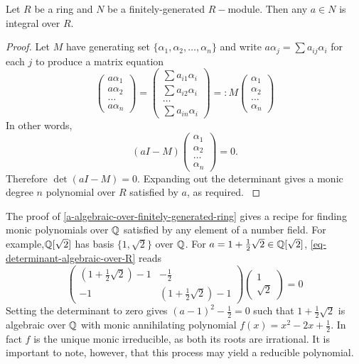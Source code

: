 \begin{lemma}\label{a-algebraic-over-finitely-generated-ring}
Let $R$ be a ring and $N$ be a finitely-generated $R-$module. Then any $a\in N$ is integral over $R$.
\end{lemma}
\begin{proof}
Let $M$ have generating set $\{\alpha_1,\alpha_2,\dots,\alpha_n\}$ and write $a\alpha_j=\sum a_{ij}\alpha_i$ for each $j$ to produce a matrix equation
$$\begin{pmatrix}
    a\alpha_1\\
    a\alpha_2\\
    \dots\\
    a\alpha_n
\end{pmatrix}=\begin{pmatrix} \sum a_{i1}\alpha_i\\\sum a_{i2}\alpha_i\\\dots\\\sum a_{in}\alpha_i
\end{pmatrix}=: M\begin{pmatrix}\alpha_1\\\alpha_2\\\dots\\\alpha_n\end{pmatrix}$$
In other words,
\begin{equation}\label{eq-determinant-algebraic-over-R}(a I-M)\begin{pmatrix}\alpha_1\\\alpha_2\\\dots\\\alpha_n\end{pmatrix}=0.\end{equation}
Therefore $\det(aI-M)=0$. Expanding out the determinant gives a monic degree $n$ polynomial over $R$ satisfied by $a$, as required. \cite{NumberFields}
\end{proof}


\begin{example}\label{recipe-for-finding-polys-over-q}
The proof of \cref{a-algebraic-over-finitely-generated-ring} gives a recipe for finding monic polynomials over $\mathbb{Q}$ satisfied by any element of a number field. For example,$\mathbb{Q}[\sqrt{2}]$ has basis $\{1,\sqrt{2}\}$ over $\mathbb{Q}$. For $a=1+\frac{1}{2}\sqrt{2}\in \mathbb{Q}[\sqrt{2}]$, \cref{eq-determinant-algebraic-over-R} reads
$$\begin{pmatrix}
(1+\frac{1}{2}\sqrt{2}) - 1 & -\frac{1}{2}\\
-1 & (1+\frac{1}{2}\sqrt{2}) - 1
\end{pmatrix}\begin{pmatrix}1\\\sqrt{2}\end{pmatrix}=0$$
Setting the determinant to zero gives $(a-1)^2-\frac{1}{2}=0$ such that $1+\frac{1}{2}\sqrt{2}$ is algebraic over $\mathbb{Q}$ with monic annihilating polynomial $f(x)=x^2-2x+\frac{1}{2}$. In fact $f$ is the unique monic irreducible, as both its roots are irrational. It is important to note, however, that this process may yield a reducible polynomial.
\end{example}

